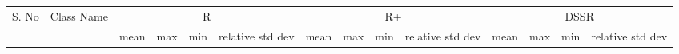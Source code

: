 \documentclass[conference]{IEEEtran}
\begin{document}
%
%

\newpage

 \begin{table} [ht] {
  \scriptsize
    \begin{tabular}{|c|l|c|c|c|c|c|c|c|c|c|c|c|c|}
      \hline
      \multirow{2}{*}{S. No}		& \multirow{2}{*}{Class Name}		& \multicolumn{4}{|c|}{R}							&	\multicolumn{4}{|c|}{R+}							&	\multicolumn{4}{|c|}{DSSR}	\\
      \cline{3-14} 
      						&							& mean & max & min & relative std dev				& mean 	& max 	& min 	& relative std dev 		& mean 		& 	max 		&	 min 		& relative std dev \\
             \hline
     

\end{tabular}}
\end{table}
\end{document}
